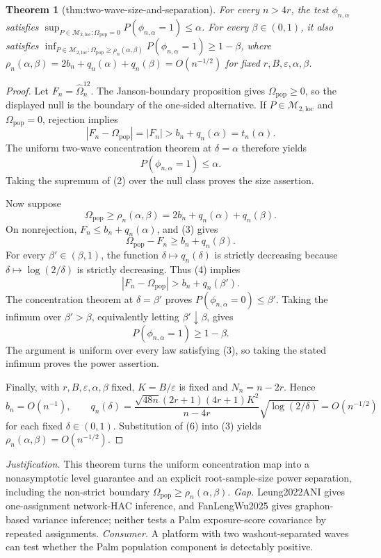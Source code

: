 \documentclass{article}
\newtheorem{theorem}{Theorem}
\begin{document}
\begin{theorem}[thm:two-wave-size-and-separation]\label{thm:two-wave-size-and-separation}
For every \(n>4r\), the test \(\phi_{n,\alpha}\) satisfies \(\sup_{P\in\mathcal M_{2,\mathrm{loc}}:\Omega_{\mathrm{pop}}=0}P(\phi_{n,\alpha}=1)\le\alpha\). For every \(\beta\in(0,1)\), it also satisfies \(\inf_{P\in\mathcal M_{2,\mathrm{loc}}:\Omega_{\mathrm{pop}}\ge\rho_n(\alpha,\beta)}P(\phi_{n,\alpha}=1)\ge1-\beta\), where \(\rho_n(\alpha,\beta)=2b_n+q_n(\alpha)+q_n(\beta)=O(n^{-1/2})\) for fixed \(r,B,\varepsilon,\alpha,\beta\).
\end{theorem}
\begin{proof}
Let \(F_n=\widehat\Omega_n^{12}\).  The Janson-boundary proposition gives \(\Omega_{\mathrm{pop}}\ge0\), so the displayed null is the boundary of the one-sided alternative.  If \(P\in\mathcal M_{2,\mathrm{loc}}\) and \(\Omega_{\mathrm{pop}}=0\), rejection implies
\[
 |F_n-\Omega_{\mathrm{pop}}|=|F_n|
 >b_n+q_n(\alpha)=t_n(\alpha). \tag{1}
\]
The uniform two-wave concentration theorem at \(\delta=\alpha\) therefore yields
\[
 P(\phi_{n,\alpha}=1)\le\alpha. \tag{2}
\]
Taking the supremum of (2) over the null class proves the size assertion.

Now suppose
\[
 \Omega_{\mathrm{pop}}\ge\rho_n(\alpha,\beta)
 =2b_n+q_n(\alpha)+q_n(\beta). \tag{3}
\]
On nonrejection, \(F_n\le b_n+q_n(\alpha)\), and (3) gives
\[
 \Omega_{\mathrm{pop}}-F_n
 \ge b_n+q_n(\beta). \tag{4}
\]
For every \(\beta'\in(\beta,1)\), the function \(\delta\mapsto q_n(\delta)\) is strictly decreasing because \(\delta\mapsto\log(2/\delta)\) is strictly decreasing.  Thus (4) implies
\[
 |F_n-\Omega_{\mathrm{pop}}|>b_n+q_n(\beta').
\]
The concentration theorem at \(\delta=\beta'\) proves \(P(\phi_{n,\alpha}=0)\le\beta'\).  Taking the infimum over \(\beta'>\beta\), equivalently letting \(\beta'\downarrow\beta\), gives
\[
 P(\phi_{n,\alpha}=1)\ge1-\beta. \tag{5}
\]
The argument is uniform over every law satisfying (3), so taking the stated infimum proves the power assertion.

Finally, with \(r,B,\varepsilon,\alpha,\beta\) fixed, \(K=B/\varepsilon\) is fixed and \(N_n=n-2r\).  Hence
\[
 b_n=O(n^{-1}),
 \qquad
 q_n(\delta)
 =\frac{\sqrt{48n}(2r+1)(4r+1)K^2}{n-4r}
  \sqrt{\log(2/\delta)}
 =O(n^{-1/2}) \tag{6}
\]
for each fixed \(\delta\in(0,1)\).  Substitution of (6) into (3) yields \(\rho_n(\alpha,\beta)=O(n^{-1/2})\).
\end{proof}
\par\smallskip\noindent \textit{Justification.} This theorem turns the uniform concentration map into a nonasymptotic level guarantee and an explicit root-sample-size power separation, including the non-strict boundary \(\Omega_{\mathrm{pop}}\ge\rho_n(\alpha,\beta)\). \textit{Gap.} Leung2022ANI gives one-assignment network-HAC inference, and FanLengWu2025 gives graphon-based variance inference; neither tests a Palm exposure-score covariance by repeated assignments. \textit{Consumer.} A platform with two washout-separated waves can test whether the Palm population component is detectably positive.
\end{document}
